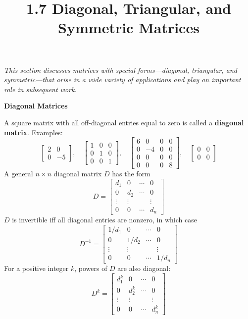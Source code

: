 \documentclass{article}
\title{1.7 Diagonal, Triangular, and Symmetric Matrices}
\date{}
\author{}
\newcommand{\redheading}[1]{{\vspace{2mm}\noindent\Large\bfseries\color{red!55!black} #1\par}\vspace{2mm}}
\theoremstyle{mystyle}
\begin{document}
\maketitle

{\itshape\color{blue!45!black}
This section discusses matrices with special forms---diagonal, triangular, and symmetric---that arise in a wide variety of applications and play an important role in subsequent work.\par}

\redheading{Diagonal Matrices}

A square matrix with all off-diagonal entries equal to zero is called a \textbf{diagonal matrix}. Examples:
\[
\begin{bmatrix}2&0\\0&-5\end{bmatrix},\quad
\begin{bmatrix}1&0&0\\0&1&0\\0&0&1\end{bmatrix},\quad
\begin{bmatrix}6&0&0&0\\0&-4&0&0\\0&0&0&0\\0&0&0&8\end{bmatrix},\quad
\begin{bmatrix}0&0\\0&0\end{bmatrix}
\]
A general $n\times n$ diagonal matrix $D$ has the form
\begin{equation}
D=\begin{bmatrix}d_1&0&\cdots&0\\0&d_2&\cdots&0\\\vdots&\vdots&&\vdots\\0&0&\cdots&d_n\end{bmatrix} \tag{1}
\end{equation}
$D$ is invertible iff all diagonal entries are nonzero, in which case
\begin{equation}
D^{-1}=\begin{bmatrix}1/d_1&0&\cdots&0\\0&1/d_2&\cdots&0\\\vdots&\vdots&&\vdots\\0&0&\cdots&1/d_n\end{bmatrix} \tag{2}
\end{equation}
For a positive integer $k$, powers of $D$ are also diagonal:
\begin{equation}
D^k=\begin{bmatrix}d_1^k&0&\cdots&0\\0&d_2^k&\cdots&0\\\vdots&\vdots&&\vdots\\0&0&\cdots&d_n^k\end{bmatrix} \tag{3}
\end{equation}
\end{document}
